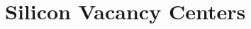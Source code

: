 
\chapter{Silicon Vacancy Centers}	\label{ch::sivs}

\begin{remark}
  \blindtext
\end{remark}

\Blindtext
